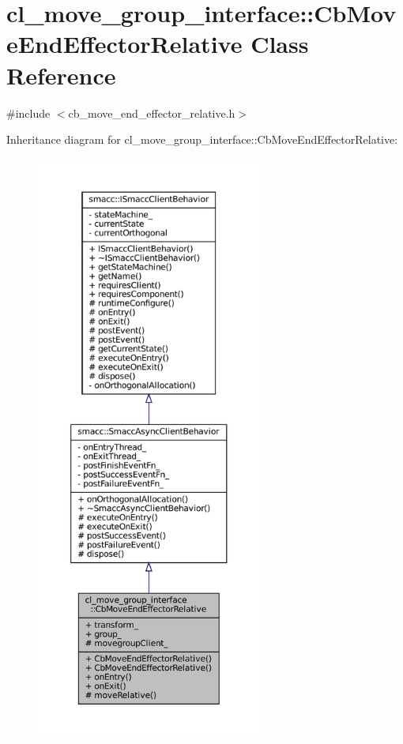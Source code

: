 \hypertarget{classcl__move__group__interface_1_1CbMoveEndEffectorRelative}{}\section{cl\+\_\+move\+\_\+group\+\_\+interface\+:\+:Cb\+Move\+End\+Effector\+Relative Class Reference}
\label{classcl__move__group__interface_1_1CbMoveEndEffectorRelative}


{\ttfamily \#include $<$cb\+\_\+move\+\_\+end\+\_\+effector\+\_\+relative.\+h$>$}



Inheritance diagram for cl\+\_\+move\+\_\+group\+\_\+interface\+:\+:Cb\+Move\+End\+Effector\+Relative\+:
\nopagebreak
\begin{figure}[H]
\begin{center}
\leavevmode
\includegraphics[height=550pt]{classcl__move__group__interface_1_1CbMoveEndEffectorRelative__inherit__graph}
\end{center}
\end{figure}


